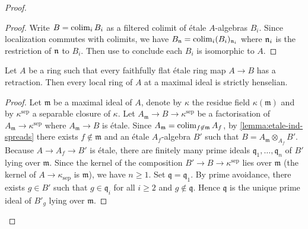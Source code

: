\begin{proof}
\begin{proof}
  Write $B = \operatorname{colim}_i B_i$ as a filtered colimit of étale $A$-algebras $B_i$. Since localization commutes with colimits, we have $B_{\mathfrak{n}} = \operatorname{colim}_i (B_i)_{{\mathfrak{n}}_i}$ where ${\mathfrak{n}}_i$ is the restriction of ${\mathfrak{n}}$ to $B_i$. Then use  to conclude each $B_i$ is isomorphic to $A$.
\end{proof}

\begin{lemma}
    Let $A$ be a ring such that every faithfully flat étale ring map $A \to B$ has
    a retraction. Then every local ring of $A$ at a maximal ideal is strictly henselian.
    \label{lemma:retractions-strictly-henselian}
\end{lemma}

\begin{proof}
    Let $\mathfrak{m}$ be a maximal ideal of $A$, denote by $\kappa$ the residue field $\kappa(\mathfrak{m})$
    and by $\kappa^{\mathrm{sep}}$ a separable closure of $\kappa$. Let
    $A_{\mathfrak{m}} \to B \to \kappa^{\mathrm{sep}}$ be a factorisation of $A_{\mathfrak{m}} \to \kappa^{\mathrm{sep}}$
    where $A_{\mathfrak{m}} \to B$ is étale. Since $A_{\mathfrak{m}} = \operatorname{colim}_{f \not\in \mathfrak{m}} A_f$,
    by \ref{lemma:etale-ind-spreads} there exists $f \not\in \mathfrak{m}$ and an étale $A_f$-algebra $B'$
    such that $B = A_{\mathfrak{m}} \otimes_{A_f} B'$.
    Because $A \to A_f \to B'$ is étale,
    there are finitely many prime ideals $\mathfrak{q}_1, \ldots, \mathfrak{q}_n$ of $B'$ lying over $\mathfrak{m}$.
    Since the kernel of the composition $B' \to B \to \kappa^{\mathrm{sep}}$ lies over $\mathfrak{m}$
    (the kernel of $A \to \kappa_{\mathrm{sep}}$ is $\mathfrak{m}$), we have $n \ge 1$.
    Set $\mathfrak{q} = \mathfrak{q}_1$. By prime avoidance, there exists $g \in B'$ such that
    $g \in \mathfrak{q}_i$ for all $i \ge 2$ and $g \not\in \mathfrak{q}$. Hence
    $\mathfrak{q}$ is the unique prime ideal of $B'_g$ lying over $\mathfrak{m}$.


\end{proof}
\end{proof}
